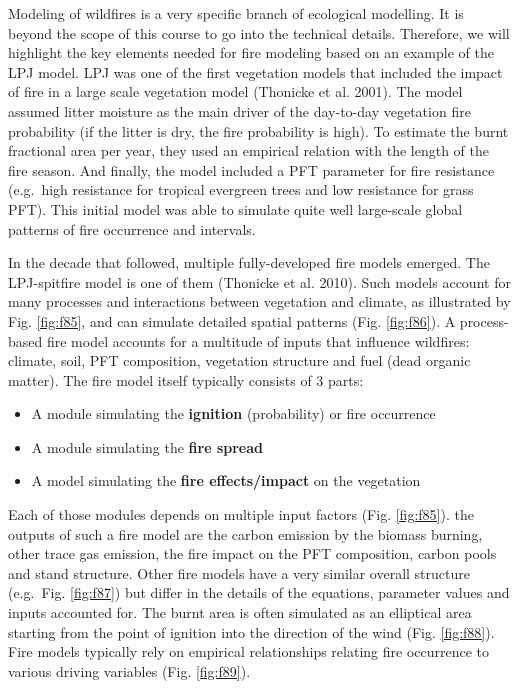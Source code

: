 \documentclass[12pt,oneside]{book}
\providecommand{\tightlist}{%
  \setlength{\itemsep}{0pt}\setlength{\parskip}{0pt}}
\begin{document}
Modeling of wildfires is a very specific branch of ecological modelling.
It is beyond the scope of this course to go into the technical details.
Therefore, we will highlight the key elements needed for fire modeling
based on an example of the LPJ model. LPJ was one of the first
vegetation models that included the impact of fire in a large scale
vegetation model (Thonicke et al. 2001). The model assumed litter
moisture as the main driver of the day-to-day vegetation fire
probability (if the litter is dry, the fire probability is high). To
estimate the burnt fractional area per year, they used an empirical
relation with the length of the fire season. And finally, the model
included a PFT parameter for fire resistance (e.g.~high resistance for
tropical evergreen trees and low resistance for grass PFT). This initial
model was able to simulate quite well large-scale global patterns of
fire occurrence and intervals.

In the decade that followed, multiple fully-developed fire models
emerged. The LPJ-spitfire model is one of them (Thonicke et al. 2010).
Such models account for many processes and interactions between
vegetation and climate, as illustrated by Fig. \ref{fig:f85}, and can
simulate detailed spatial patterns (Fig. \ref{fig:f86}). A process-based
fire model accounts for a multitude of inputs that influence wildfires:
climate, soil, PFT composition, vegetation structure and fuel (dead
organic matter). The fire model itself typically consists of 3 parts:

\begin{itemize}
\tightlist
\item
  A module simulating the \textbf{ignition} (probability) or fire
  occurrence
\item
  A module simulating the \textbf{fire spread}
\item
  A model simulating the \textbf{fire effects/impact} on the vegetation
\end{itemize}

Each of those modules depends on multiple input factors (Fig.
\ref{fig:f85}). the outputs of such a fire model are the carbon emission
by the biomass burning, other trace gas emission, the fire impact on the
PFT composition, carbon pools and stand structure. Other fire models
have a very similar overall structure (e.g.~Fig. \ref{fig:f87}) but
differ in the details of the equations, parameter values and inputs
accounted for. The burnt area is often simulated as an elliptical area
starting from the point of ignition into the direction of the wind (Fig.
\ref{fig:f88}). Fire models typically rely on empirical relationships
relating fire occurrence to various driving variables (Fig.
\ref{fig:f89}).
\end{document}
